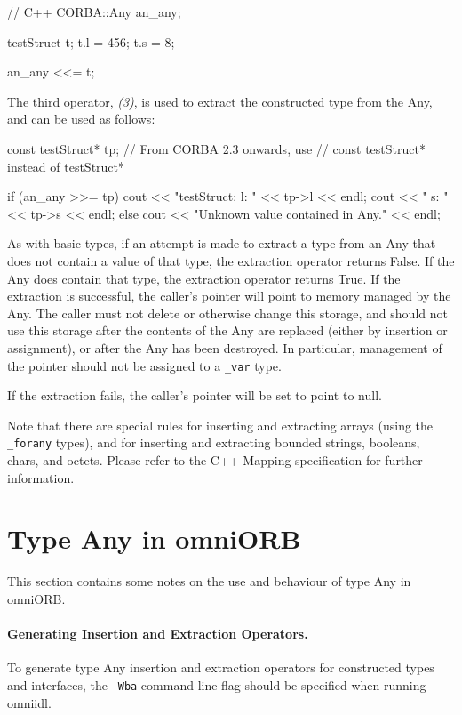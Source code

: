 \documentclass[11pt,twoside,a4paper]{book}
\newcommand{\type}[1]{\texttt{#1}}
\begin{document}
\begin{cxxlisting}
// C++
CORBA::Any an_any;

testStruct t;
t.l = 456;
t.s = 8;

an_any <<= t;
\end{cxxlisting}


The third operator, \emph{(3)}, is used to extract the constructed
type from the Any, and can be used as follows:

\begin{cxxlisting}
const testStruct* tp;   // From CORBA 2.3 onwards, use 
                        // const testStruct* instead of testStruct*

if (an_any >>= tp) {
    cout << "testStruct: l: " << tp->l << endl;
    cout << "            s: " << tp->s << endl;
}
else {
    cout << "Unknown value contained in Any." << endl;
}
\end{cxxlisting}

As with basic types, if an attempt is made to extract a type from an
Any that does not contain a value of that type, the extraction
operator returns False. If the Any does contain that type, the
extraction operator returns True. If the extraction is successful, the
caller's pointer will point to memory managed by the Any. The caller
must not delete or otherwise change this storage, and should not use
this storage after the contents of the Any are replaced (either by
insertion or assignment), or after the Any has been destroyed. In
particular, management of the pointer should not be assigned to a
\type{\_var} type.

If the extraction fails, the caller's pointer will be set to point to
null.

Note that there are special rules for inserting and extracting arrays
(using the \type{\_forany} types), and for inserting and extracting
bounded strings, booleans, chars, and octets. Please refer to the C++
Mapping specification for further information.



\section{Type Any in omniORB}
\label{anyOmniORB}

This section contains some notes on the use and behaviour of type Any
in omniORB.

\paragraph*{Generating Insertion and Extraction Operators.}
To generate type Any insertion and extraction operators for
constructed types and interfaces, the \texttt{-Wba} command line flag
should be specified when running omniidl.
\end{document}
